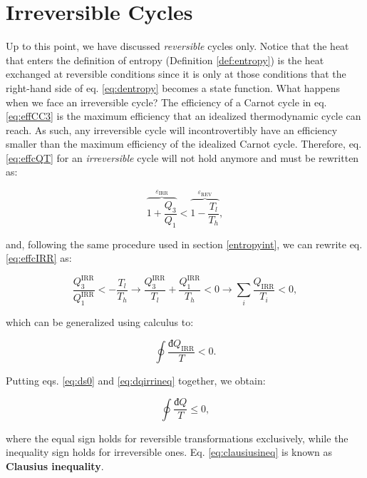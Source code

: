 \documentclass[
  9pt,
]{extbook}
\theoremstyle{definition}
\theoremstyle{definition}
\theoremstyle{definition}
\theoremstyle{definition}
\theoremstyle{remark}
\begin{document}
\section{Irreversible Cycles}\label{irreversible-cycles}

Up to this point, we have discussed \emph{reversible} cycles only. Notice that the heat that enters the definition of entropy (Definition \ref{def:entropy}) is the heat exchanged at reversible conditions since it is only at those conditions that the right-hand side of eq. \eqref{eq:dentropy} becomes a state function. What happens when we face an irreversible cycle? The efficiency of a Carnot cycle in eq. \eqref{eq:effCC3} is the maximum efficiency that an idealized thermodynamic cycle can reach. As such, any irreversible cycle will incontrovertibly have an efficiency smaller than the maximum efficiency of the idealized Carnot cycle. Therefore, eq. \eqref{eq:effcQT} for an \emph{irreversible} cycle will not hold anymore and must be rewritten as:

\begin{equation}
\overbrace{1+\frac{Q_3}{Q_1}}^{\varepsilon_{\mathrm{IRR}}} < \overbrace{1-\frac{T_l}{T_h}}^{\varepsilon_{\mathrm{REV}}},
\label{eq:effcIRR}
\end{equation}

and, following the same procedure used in section \ref{entropyint}, we can rewrite eq. \eqref{eq:effcIRR} as:

\begin{equation}
\frac{Q^{\text{IRR}}_3}{Q^{\text{IRR}}_1} < - \frac{T_l}{T_h} \longrightarrow \frac{Q^{\text{IRR}}_3}{T_l} + \frac{Q^{\text{IRR}}_1}{T_h} < 0 \longrightarrow \sum_i \frac{Q_{\text{IRR}}}{T_i} < 0,
\label{eq:effcIRR2}
\end{equation}

which can be generalized using calculus to:

\begin{equation}
\oint \frac{đQ_{\mathrm{IRR}}}{T} < 0.
\label{eq:dqirrineq}
\end{equation}

Putting eqs. \eqref{eq:ds0} and \eqref{eq:dqirrineq} together, we obtain:

\begin{equation}
\oint \frac{đQ}{T} \leq 0,
\label{eq:clausiusineq}
\end{equation}

where the equal sign holds for reversible transformations exclusively, while the inequality sign holds for irreversible ones. Eq. \eqref{eq:clausiusineq} is known as \textbf{Clausius inequality}.
\end{document}
